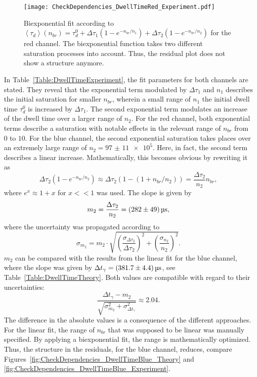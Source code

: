 \begin{figure}[h]
	\centering
	\texttt{[image: CheckDependencies\_DwellTimeRed\_Experiment.pdf]}
	\caption[Biexponential fit of dwell time for red channel]{Biexponential fit according to $\left\langle \tau_d \right\rangle (n_{br}) = \tau_d^0 + \Delta \tau_1 (1 - e^{-n_{br}/ n_1}) + \Delta \tau_2 (1 - e^{-n_{br}/ n_2})$ for the red channel. The biexponential function takes two different saturation processes into account. Thus, the residual plot does not show a structure anymore.}
	\label{fig:CheckDependencies_DwellTimeRed_Experiment}
\end{figure}
\clearpage
In Table~\ref{Table:DwellTimeExperiment}, the fit parameters for both channels are stated. They reveal that the exponential term modulated by $\Delta \tau_1$ and $n_1$ describes the initial saturation for smaller $n_{br}$, wherein a small range of $n_1$ the initial dwell time $\tau_d^0$ is increased by $\Delta \tau_1$. The second exponential term modulates an increase of the dwell time over a larger range of $n_2$. For the red channel, both exponential terms describe a saturation with notable effects in the relevant range of $n_{br}$ from $0$ to $10$. For the blue channel, the second exponential saturation takes places over an extremely large range of $n_2 = \num[{scientific-notation = true, separate-uncertainty = true}]{97(11)e5}$. Here, in fact, the second term describes a linear increase. Mathematically, this becomes obvious by rewriting it as
\begin{equation}
\Delta \tau_2 (1 - e^{-n_{br}/ n_2}) \approx \Delta \tau_2 (1 - (1 + n_{br}/ n_2)) = \frac{\Delta \tau_2}{n_2} n_{br},
\end{equation}
where $e^x \approx 1 + x$ for $x << 1$ was used. The slope is given by
\begin{equation}
m_2 = \frac{\Delta \tau_2}{n_2} = \SI{282 +- 49}{\micro\second},
\end{equation}
where the uncertainty was propagated according to
\begin{equation}
\sigma_{m_2} = m_2 \cdot \sqrt{\left(\frac{\sigma_{\Delta \tau_2}}{\Delta \tau_2}\right)^2 + \left(\frac{\sigma_{n_2}}{n_2}\right)^2}.
\end{equation}
$m_2$ can be compared with the results from the linear fit for the blue channel, where the slope was given by $\Delta t_{\gamma} = \SI{381.7 +- 4.4}{\micro\second}$, see Table~\ref{Table:DwellTimeTheory}. Both values are compatible with regard to their uncertainties:
\begin{equation}
\frac{\Delta t_{\gamma} - m_2}{\sqrt{\sigma_{m_2}^2 + \sigma_{\Delta t_{\gamma}}^2}} \approx \num{2.04}.
\end{equation}
The difference in the absolute values is a consequence of the different approaches. For the linear fit, the range of $n_{br}$ that was supposed to be linear was manually specified. By applying a biexponential fit, the range is mathematically optimized. Thus, the structure in the residuals, for the blue channel, reduces, compare Figures~\ref{fig:CheckDependencies_DwellTimeBlue_Theory} and \ref{fig:CheckDependencies_DwellTimeBlue_Experiment}.

